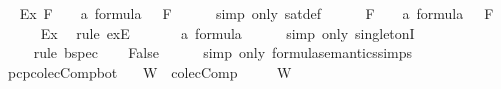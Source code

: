 \begin{isabellebody}
\ \isamarkupfalse%
\ Ex{\isacharcolon}{\isachardoublequoteopen}{\isasymexists}{\isasymA}{\isachardot}\ {\isasymforall}F\ {\isasymin}\ {\isacharbraceleft}{\isasymbottom}\ {\isacharcolon}{\isacharcolon}\ {\isacharprime}a\ formula{\isacharbraceright}{\isachardot}\ {\isasymA}\ {\isasymTurnstile}\ F{\isachardoublequoteclose}\isanewline
\ \ \ \ \isamarkupfalse%
\ {\isacharparenleft}simp\ only{\isacharcolon}\ sat{\isacharunderscore}def{\isacharparenright}\isanewline
\ \ \isamarkupfalse%
\ {\isasymA}\ \ {}{\isacharcolon}{\isachardoublequoteopen}{\isasymforall}F\ {\isasymin}\ {\isacharbraceleft}{\isasymbottom}\ {\isacharcolon}{\isacharcolon}\ {\isacharprime}a\ formula{\isacharbraceright}{\isachardot}\ {\isasymA}\ {\isasymTurnstile}\ F{\isachardoublequoteclose}\isanewline
\ \ \ \ \isamarkupfalse%
\ Ex\ \isamarkupfalse%
\ {\isacharparenleft}rule\ exE{\isacharparenright}\isanewline
\ \ \isamarkupfalse%
\ {}{\isacharcolon}{\isachardoublequoteopen}{\isasymbottom}\ {\isasymin}\ {\isacharbraceleft}{\isasymbottom}{\isacharcolon}{\isacharcolon}\ {\isacharprime}a\ formula{\isacharbraceright}{\isachardoublequoteclose}\isanewline
\ \ \ \ \isamarkupfalse%
\ {\isacharparenleft}simp\ only{\isacharcolon}\ singletonI{\isacharparenright}\isanewline
\ \ \isamarkupfalse%
\ {\isachardoublequoteopen}{\isasymA}\ {\isasymTurnstile}\ {\isasymbottom}{\isachardoublequoteclose}\isanewline
\ \ \ \ \isamarkupfalse%
\ {}\ {}\ \isamarkupfalse%
\ {\isacharparenleft}rule\ bspec{\isacharparenright}\isanewline
\ \ \isamarkupfalse%
\ {\isachardoublequoteopen}False{\isachardoublequoteclose}\isanewline
\ \ \ \ \isamarkupfalse%
\ {\isacharparenleft}simp\ only{\isacharcolon}\ formula{\isacharunderscore}semantics{\isachardot}simps{\isacharparenleft}{}{\isacharparenright}{\isacharparenright}\isanewline
{}\isamarkupfalse%
%
\endisatagproof
{\isafoldproof}%
%
\isadelimproof
\isanewline
%
\endisadelimproof
\isanewline
{}\isamarkupfalse%
\ pcp{\isacharunderscore}colecComp{\isacharunderscore}bot{\isacharcolon}\isanewline
\ \ \ {\isachardoublequoteopen}W\ {\isasymin}\ colecComp{\isachardoublequoteclose}\isanewline
\ \ \ {\isachardoublequoteopen}{\isasymbottom}\ {\isasymnotin}\ W{\isachardoublequoteclose}\isanewline
%
\isadelimproof
%
\endisadelimproof
%
\isatagproof
{}\isamarkupfalse%

\end{isabellebody}
